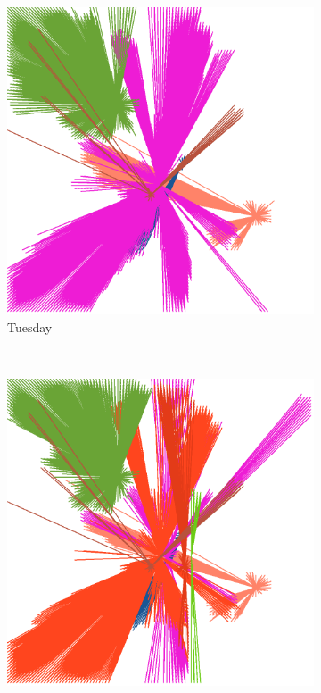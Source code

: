 \documentclass[12pt,a4paper]{article}
\begin{document}
\begin{figure}[H]
\begin{subfigure}[b]{0.48\textwidth}
\includegraphics[width=\textwidth]{weekDef/edges-2Tue-big.png}
\caption{Tuesday}
\end{subfigure}
\\
\begin{subfigure}[b]{0.48\textwidth}
\includegraphics[width=\textwidth]{weekDef/edges-3Wed-big.png}

\end{subfigure}
\end{figure}
\end{document}
